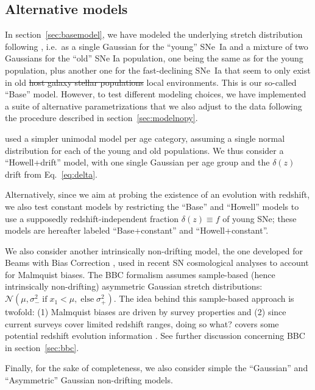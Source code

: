 \documentclass[]{aa} %
\newcommand{\yc}[1]{{\textcolor{BrickRed}{#1}}}
\begin{document}
\subsection{Alternative models}\label{sec:othermodel}

In section~\ref{sec:basemodel}, we have modeled the underlying stretch
distribution following \cite{rigault2018}, i.e.\ as a single Gaussian for the
``young'' SNe~Ia and a mixture of two Gaussians for the ``old'' SNe Ia population, one
\yc{being} the same as for the young population, plus another one for the fast-declining SNe~Ia
that seem to only exist in old \yc{\sout{host galaxy stellar populations} local environments}.
This is our so-called ``Base'' model.
However, to test different modeling choices, we have implemented a suite of
alternative parametrizations that we also adjust to the data following the
procedure described in section~\ref{sec:modelnopy}. 

\cite{howell2007} used a simpler \yc{unimodal} model per age category, assuming a \yc{single} normal
distribution for \yc{each of} the young and old populations. We thus consider a
``Howell+drift'' model, with one single Gaussian per age group and the
$\delta(z)$ drift from Eq.~\ref{eq:delta}.

Alternatively, since we aim at probing the existence of an \yc{evolution with redshift}, we
also test \yc{constant} models by restricting the ``Base'' and ``Howell'' models
to use a supposedly redshift-independent fraction $\delta(z) \equiv f$ of young SNe;
these models are \yc{hereafter} labeled ``Base+constant'' and ``Howell+constant''.

We also consider another \yc{intrinsically} non-drifting model, the one developed for Beams
with Bias Correction \cite[BBC,][]{scolnic2016, kessler2017}, used in recent SN
cosmological analyses \cite[e.g.][]{scolnic2018a, descosmopaper2019, riess2016,
riess2019} to account for Malmquist biases. The BBC formalism assumes
sample-based (hence intrinsically non-drifting) asymmetric Gaussian stretch
distributions: $\mathcal{N}\left(\mu,
\sigma_{-}^2\;\text{if}\;x_1<\mu,\;\text{else}\;\sigma_{+}^2\right)$. The idea
behind this sample-based approach is twofold: (1) Malmquist biases are driven by
survey properties and (2) \yc{since} current surveys cover limited redshift ranges,
doing so \yc{what?} covers some potential redshift evolution information
\citep{scolnic2016, scolnic2018a}. See further discussion concerning BBC in
section~\ref{sec:bbc}. 

Finally, for the sake of completeness, we also consider simple the ``Gaussian'' and
``Asymmetric'' Gaussian non-drifting models. 
\end{document}

